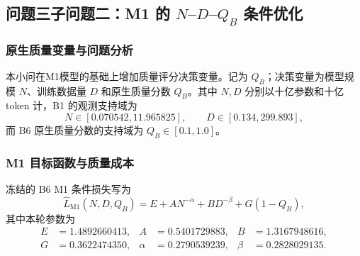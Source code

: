 
\subsection{问题三子问题二：M1 的 $N$--$D$--$Q_B$ 条件优化}
\label{sec:q3-subproblem2}

\subsubsection{原生质量变量与问题分析}

本小问在M1模型的基础上增加质量评分决策变量。记为
$Q_B$；决策变量为模型规模 $N$、训练数据量 $D$ 和原生质量分数 $Q_B$。其中
$N,D$ 分别以十亿参数和十亿 token 计，B1 的观测支持域为
\begin{equation}
 N\in[0.070542,11.965825],\qquad
 D\in[0.134,299.893],
 \label{eq:q3-sp2-support}
\end{equation}
而 B6 原生质量分数的支持域为 $Q_B\in[0.1,1.0]$。

\subsubsection{M1 目标函数与质量成本}

冻结的 B6 M1 条件损失写为
\begin{equation}
 \widehat L_{\mathrm{M1}}(N,D,Q_B)
 =E+A N^{-\alpha}+B D^{-\beta}+G(1-Q_B),
 \label{eq:q3-sp2-m1-loss}
\end{equation}
其中本轮参数为
\begin{equation}
 \begin{aligned}
 E&=1.4892660413, & A&=0.5401729883, & B&=1.3167948616,\\
 G&=0.3622474350, & \alpha&=0.2790539239, & \beta&=0.2828029135.
 \end{aligned}
 \label{eq:q3-sp2-m1-parameters}
\end{equation}

